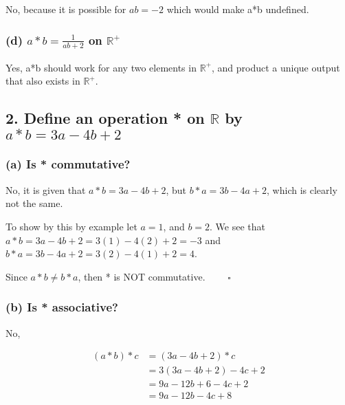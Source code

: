 \documentclass[
]{article}
\begin{document}
No, because it is possible for \(ab=-2\) which would make a*b undefined.

\hypertarget{d-abfrac1ab2-on-mathbbr}{%
\subsubsection{\texorpdfstring{(d) \(a*b=\frac{1}{ab+2}\) on
\(\mathbb{R}^+\)}{(d) a*b=\textbackslash frac\{1\}\{ab+2\} on \textbackslash mathbb\{R\}\^{}+}}\label{d-abfrac1ab2-on-mathbbr}}

Yes, a*b should work for any two elements in \(\mathbb{R}^+\), and
product a unique output that also exists in \(\mathbb{R}^+\).

\hypertarget{define-an-operation-on-mathbbr-by-ab3a-4b2}{%
\subsection{\texorpdfstring{2. Define an operation * on \(\mathbb{R}\)
by
\(a*b=3a-4b+2\)}{2. Define an operation * on \textbackslash mathbb\{R\} by a*b=3a-4b+2}}\label{define-an-operation-on-mathbbr-by-ab3a-4b2}}

\hypertarget{a-is-commutative}{%
\subsubsection{(a) Is * commutative?}\label{a-is-commutative}}

No, it is given that \(a*b=3a-4b+2\), but \(b*a=3b-4a+2\), which is
clearly not the same.

To show by this by example let \(a=1\), and \(b=2\). We see that
\(a*b=3a-4b+2=3(1)-4(2)+2=-3\) and \(b*a=3b-4a+2=3(2)-4(1)+2=4\).

Since \(a*b\ne b*a\), then * is NOT commutative. \(\quad\quad\square\)

\hypertarget{b-is-associative}{%
\subsubsection{(b) Is * associative?}\label{b-is-associative}}

No,

\begin{equation}
\label{1b}
\begin{split}
(a*b)*c &= (3a-4b+2)*c\\
&= 3(3a-4b+2)-4c+2\\
&= 9a-12b+6-4c+2\\
&= 9a-12b-4c+8
\end{split}
\end{equation}
\end{document}
